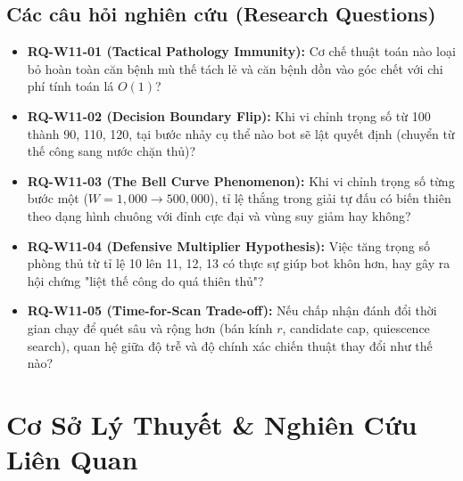 \documentclass[11pt,a4paper]{article}
\begin{document}
\subsection{Các câu hỏi nghiên cứu (Research Questions)}
\begin{itemize}
    \item \textbf{RQ-W11-01 (Tactical Pathology Immunity):} Cơ chế thuật toán nào loại bỏ hoàn toàn căn bệnh mù thế tách lẻ và căn bệnh dồn vào góc chết với chi phí tính toán lá $O(1)$?
    \item \textbf{RQ-W11-02 (Decision Boundary Flip):} Khi vi chỉnh trọng số từ 100 thành 90, 110, 120, tại bước nhảy cụ thể nào bot sẽ lật quyết định (chuyển từ thế công sang nước chặn thủ)?
    \item \textbf{RQ-W11-03 (The Bell Curve Phenomenon):} Khi vi chỉnh trọng số từng bước một ($W = 1{,}000 \to 500{,}000$), tỉ lệ thắng trong giải tự đấu có biến thiên theo dạng hình chuông với đỉnh cực đại và vùng suy giảm hay không?
    \item \textbf{RQ-W11-04 (Defensive Multiplier Hypothesis):} Việc tăng trọng số phòng thủ từ tỉ lệ 10 lên 11, 12, 13 có thực sự giúp bot khôn hơn, hay gây ra hội chứng "liệt thế công do quá thiên thủ"?
    \item \textbf{RQ-W11-05 (Time-for-Scan Trade-off):} Nếu chấp nhận đánh đổi thời gian chạy để quét sâu và rộng hơn (bán kính $r$, candidate cap, quiescence search), quan hệ giữa độ trễ và độ chính xác chiến thuật thay đổi như thế nào?
\end{itemize}

\section{Cơ Sở Lý Thuyết \& Nghiên Cứu Liên Quan}
\end{document}
